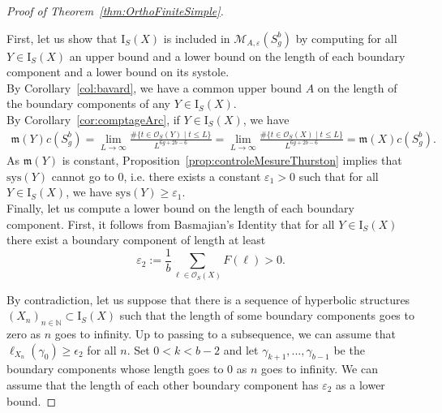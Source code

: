 \documentclass[a4paper,12pt]{article}
\theoremstyle{definition}
\theoremstyle{remark}
\begin{document}
\begin{proof}[Proof of Theorem~\ref{thm:OrthoFiniteSimple}]\label{proof:FiniSimple}

    
    First, let us show that $\mathrm{I}_S(X)$ is included in $\mathcal{M}_{A, \varepsilon}(S_g^b)$ by computing for all $Y \in \mathrm{I}_S(X)$ an upper bound and a lower bound on the length of each boundary component and a lower bound on its systole. \\
    
    By Corollary~\ref{col:bavard}, we have a common upper bound $A$ on the length of the boundary components of any $Y \in \mathrm{I}_S(X)$.\\
    By Corollary~\ref{cor:comptageArc}, if $Y \in \mathrm{I}_S(X)$, we have
    \begin{align*}
        \mathfrak{m}(Y)c(S_g^b)=\lim_{L\to\infty}\frac{\# \{ t \in \mathcal{O}_S(Y) \mid t \leqslant L \}}{L^{6g+2b-6}}=\lim_{L\to\infty}\frac{\# \{ t \in \mathcal{O}_S(X) \mid t \leqslant L \}}{L^{6g+2b-6}}=\mathfrak{m}(X)c(S_g^b).
    \end{align*}
    As $\mathfrak{m}(Y)$ is constant, Proposition~\ref{prop:controleMesureThurston} implies that $\mathrm{sys}(Y)$ cannot go to $0$, i.e. there exists a constant $\varepsilon_1>0$ such that for all $Y \in \mathrm{I}_S(X)$, we have $\mathrm{sys}(Y) \geqslant \varepsilon_1$. \\

    
    Finally, let us compute a lower bound on the length of each boundary component. First, it follows from Basmajian's Identity that for all $Y \in \mathrm{I}_S(X)$ there exist a boundary component of length at least
    \[
        \varepsilon_2 := \frac{1}{b}\sum_{\ell \in \mathcal{O}_S(X)} F(\ell)>0 .
    \]
    
    
    
    By contradiction, let us suppose that there is a sequence of hyperbolic structures $(X_n)_{n\in\mathbb{N}} \subset \mathrm{I}_S(X)$ such that the length of some boundary components goes to zero as $n$ goes to infinity. Up to passing to a subsequence, we can assume that $\ell_{X_n}(\gamma_0) \geqslant \epsilon_2$ for all $n$. Set $0<k <b-2$ and let $\gamma_{k+1},...,\gamma_{b-1}$ be the boundary components whose length goes to $0$ as $n$ goes to infinity. We can assume that the length of each other boundary component has $\varepsilon_2$ as a lower bound.
    

\end{proof}
\end{document}

